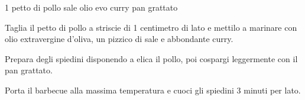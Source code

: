 \begin{ingreds}
	1 petto di pollo
	sale
	olio evo
	curry
	pan grattato
\end{ingreds}

\begin{method}
Taglia il petto di pollo a striscie di 1 centimetro di lato e mettilo a marinare con olio extravergine d'oliva, un pizzico di sale e abbondante curry.

Prepara degli spiedini disponendo a elica il pollo, poi cospargi leggermente con il pan grattato.

Porta il barbecue alla massima temperatura e cuoci gli spiedini 3 minuti per lato.
\end {method}
